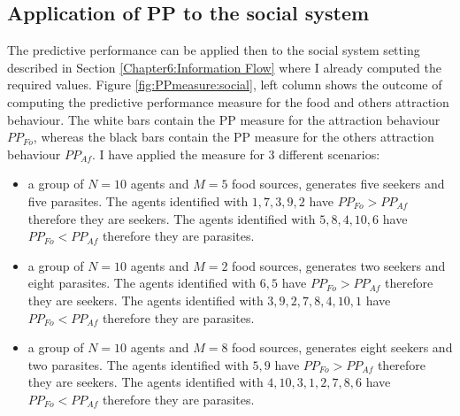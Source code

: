 \subsection{Application of PP to the social system}
\label{Chapter8:PPsocial}
The predictive performance can be applied then to the social system
setting described in Section \ref{Chapter6:Information Flow} where
I already computed the required values.
Figure \ref{fig:PPmeasure:social}, left column shows the outcome of computing the predictive
performance measure for the food and others attraction behaviour.
The white bars contain the PP measure for the attraction behaviour $PP_{Fo}$, whereas
the black bars contain the PP measure for the others attraction behaviour $PP_{Af}$.
I have applied the measure for 3 different scenarios:
\begin{itemize}
 \item a group of $N=10$ agents and $M=5$ food sources, generates five seekers and five parasites.
The agents identified with $1,7,3,9,2$ have $PP_{Fo}> PP_{Af}$ therefore they are
seekers.
The agents identified with $5,8,4,10,6$ have $PP_{Fo}< PP_{Af}$ therefore they are
parasites.
 \item a group of $N=10$ agents and $M=2$ food sources, generates two seekers and eight parasites.
The agents identified with $6,5$ have $PP_{Fo}> PP_{Af}$ therefore they are
seekers.
The agents identified with $3,9,2,7,8,4,10,1$ have $PP_{Fo}< PP_{Af}$ therefore they are
parasites.
 \item a group of $N=10$ agents and $M=8$ food sources, generates eight seekers and two parasites.
The agents identified with $5,9$ have $PP_{Fo}> PP_{Af}$ therefore they are
seekers.
The agents identified with $4,10,3,1,2,7,8,6$ have $PP_{Fo}< PP_{Af}$ therefore they are
parasites.
\end{itemize}

